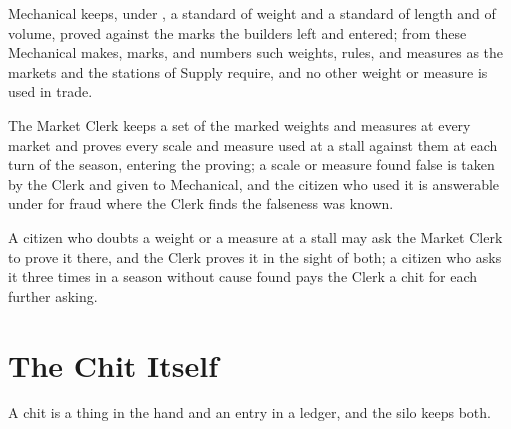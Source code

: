 \begin{clauses}
\item Mechanical keeps, under , a standard of weight and a standard of length and of volume, proved against the marks the builders left and entered; from these Mechanical makes, marks, and numbers such weights, rules, and measures as the markets and the stations of Supply require, and no other weight or measure is used in trade.
\item The Market Clerk keeps a set of the marked weights and measures at every market and proves every scale and measure used at a stall against them at each turn of the season, entering the proving; a scale or measure found false is taken by the Clerk and given to Mechanical, and the citizen who used it is answerable under  for fraud where the Clerk finds the falseness was known.
\item A citizen who doubts a weight or a measure at a stall may ask the Market Clerk to prove it there, and the Clerk proves it in the sight of both; a citizen who asks it three times in a season without cause found pays the Clerk a chit for each further asking.
\end{clauses}

\section{The Chit Itself}
\label{sec:commerce:chit-itself}

A chit is a thing in the hand and an entry in a ledger, and the silo keeps both.

